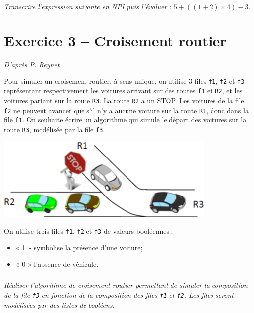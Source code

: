 \documentclass[10pt,fleqn]{article} %
\begin{document}
\begin{multicols}{2}
\subparagraph{}
\textit{Transcrire l'expression suivante en NPI puis l'évaluer : $5+\left(\left( 1+2\right)\times4 \right)-3$.}

\section*{Exercice 3 -- Croisement routier}
\setcounter{exo}{0}
\textit{D'après P. Beynet}

Pour simuler un croisement routier, à sens unique, on utilise 3 files \texttt{f1}, \texttt{f2} et \texttt{f3} représentant respectivement les voitures arrivant sur des routes \texttt{f1} et \texttt{R2}, et les voitures partant sur la route \texttt{R3}.
La route \texttt{R2} a un STOP. Les voitures de la file \texttt{f2} ne peuvent avancer que s’il n’y a aucune voiture sur la route \texttt{R1}, donc dans la file \texttt{f1}. On souhaite écrire un algorithme qui simule le départ des voitures sur la route \texttt{R3}, modélisée par la file \texttt{f3}.
\begin{center}
\includegraphics[width=.8\linewidth]{images/file_01}
\end{center}
On utilise trois files \texttt{f1}, \texttt{f2} et \texttt{f3} de valeurs booléennes :
\begin{itemize}
\item  « 1 » symbolise la présence d’une voiture;
\item  « 0 » l’absence de véhicule.
\end{itemize}

\subparagraph{}
\textit{Réaliser l'algorithme de croisement routier permettant de simuler la composition de la file \texttt{f3} en fonction de la composition des files \texttt{f1} et \texttt{f2}. Les files seront modélisées par des listes de booléens.}

\end{multicols}
\end{document}
